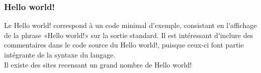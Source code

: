 \subsubsection{Hello world!}
\label{hello}

Le Hello world! correspond à un code minimal d'exemple, consistant en l'affichage de la phrase «Hello world!» sur la sortie standard. Il est intéressant d'inclure des commentaires dans le code source du Hello world!, puisque ceux-ci font partie intégrante de la syntaxe du langage.\\

Il existe des sites recensant un grand nombre de Hello world! \cite{bib_hello} \cite{bib_wiki_hello}